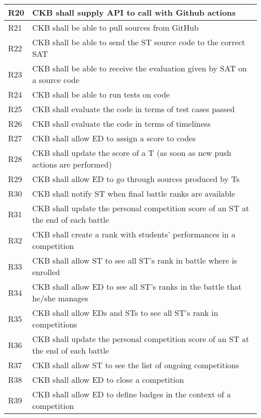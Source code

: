 \begin{longtable}{|p{3cm}|p{10cm}|}
        \hline
        R20 & CKB shall supply API to call with Github actions \\
        \hline
        R21 & CKB shall be able to pull sources from GitHub \\
        \hline
        R22 & CKB shall be able to send the ST source code to the correct SAT \\
        \hline
        R23 & CKB shall be able to receive the evaluation given by SAT on a source code \\
        \hline
        R24 & CKB shall be able to run tests on code \\
        \hline
        R25 & CKB shall evaluate the code in terms of test cases passed \\
        \hline
        R26 & CKB shall evaluate the code in terms of timeliness \\
        \hline
        R27 & CKB shall allow ED to assign a score to codes \\
        \hline
        R28 & CKB shall update the score of a T (as soon as new push actions are performed) \\
        \hline
        R29 & CKB shall allow ED to go through sources produced by Ts \\
        \hline
        R30 & CKB shall notify ST when final battle ranks are available \\
        \hline
        R31 & CKB shall update the personal competition score of an ST at the end of each battle \\
        \hline
        R32 & CKB shall create a rank with students' performances in a competition \\
        \hline
        R33 & CKB shall allow ST to see all ST’s rank in battle where is enrolled \\
        \hline
        R34 & CKB shall allow ED to see all ST’s ranks in the battle that he/she manages \\
        \hline
        R35 & CKB shall allow EDs and STs to see all ST’s rank in competitions \\
        \hline
        R36 & CKB shall update the personal competition score of an ST at the end of each battle \\
        \hline
        R37 & CKB shall allow ST to see the list of ongoing competitions \\
        \hline
        R38 & CKB shall allow ED to close a competition \\
        \hline
        R39 & CKB shall allow ED to define badges in the context of a competition \\

\end{longtable}
